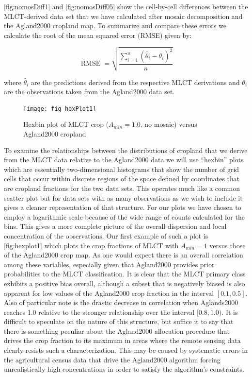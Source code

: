 \autoref{fig:nomosDiff1} and \autoref{fig:nomosDiff05} show the
cell-by-cell differences between the MLCT-derived data set that we
have calculated after mosaic decomposition and the Agland2000 cropland
map.  To summarize and compare these errors we calculate the root of
the mean squared error (RMSE) given by:

$$
\operatorname{RMSE}=\sqrt{\frac{\sum_{i=1}^{n}(\hat\theta_i-\theta_i )^2}{n}}
$$

where $\hat\theta_i$ are the predictions derived from the respective
MLCT derivations and $\theta_i$ are the observations taken from the
Agland2000 data set.




\begin{figure}[ht]
  \centering


\texttt{[image: fig\_hexPlot1]}
  \caption{Hexbin plot of MLCT crop ($A_{min}=1.0$, no mosaic) versus Agland2000 cropland}
  \label{fig:hexplot1} 
\end{figure} 

To examine the relationships between the distributions of cropland
that we derive from the MLCT data relative to the Agland2000 data we
will use ``hexbin'' plots which are essentially two-dimensional
histograms that show the number of grid cells that occur within
discrete regions of the space defined by coordinates that are cropland
fractions for the two data sets.  This operates much like a common
scatter plot but for data sets with as many observations as we wish to
include it gives a cleaner representation of that structure.  For our
plots we have chosen to employ a logarithmic scale because of the wide
range of counts calculated for the bins.  This gives a more complete
picture of the overall dispersion and local concentration of the
observations.  Our first example of such a plot is
\autoref{fig:hexplot1} which plots the crop fractions of MLCT with
$A_{min}=1$ versus those of the Agland2000 crop map.  As one would
expect there is an overall correlation among these variables,
especially given that Agland2000 provides prior probabilities to the
MLCT classification.  It is clear that the MLCT primary class
exhibits a positive bias overall, although a subset that is negatively
biased is also apparent for low values of the Agland2000 crop fraction
in the interval $[0.1,0.5]$.  Also of particular note is the drastic
decrease in correlation when Aglands2000 reaches 1.0 relative to the
stronger relationship over the interval $[0.8,1.0)$.  It is difficult
to speculate on the nature of this structure, but suffice it to say
that there is something peculiar about the Agland2000 allocation
procedure that drives the crop fraction to its maximum in areas where
the remote sensing data clearly resists such a characterization.  This
may be caused by systematic errors in the agricultural census data
that drive the Agland2000 algorithm forcing unrealistically high
concentrations in order to satisfy the algorithm's constraints. 
 




